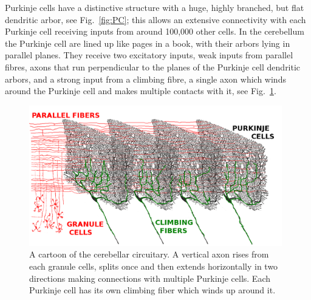 \documentclass[12pt]{article}
\begin{document}
Purkinje cells have a distinctive structure with a huge, highly
branched, but flat dendritic arbor, see Fig.~\ref{fig:PC}; this allows
an extensive connectivity with each Purkinje cell receiving inputs
from around 100,000 other cells. In the cerebellum the Purkinje cell
are lined up like pages in a book, with their arbors lying in parallel
planes. They receive two excitatory inputs, weak inputs from parallel
fibres, axons that run perpendicular to the planes of the Purkinje
cell dendritic arbors, and a strong input from a climbing fibre, a
single axon which winds around the Purkinje cell and makes multiple
contacts with it, see Fig.~\ref{fig:cerebellum}.

\begin{figure}
\begin{center}
\includegraphics[width=11cm]{cerebellum.png}
\end{center}
\caption{A cartoon of the cerebellar circuitary. A vertical axon rises
  from each granule cells, splits once and then extends horizontally
  in two directions making connections with multiple Purkinje
  cells. Each Purkinje cell has its own climbing fiber which winds up
  around it.\label{fig:cerebellum}}
\end{figure}
\end{document}
